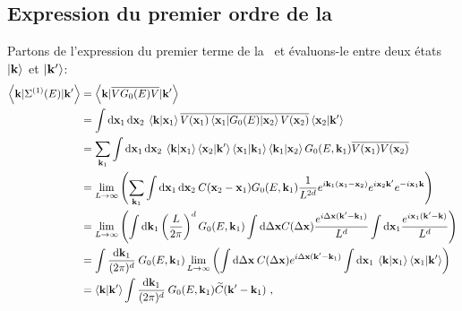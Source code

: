 \subsection{Expression du premier ordre de la \selfenergy}
Partons de l'expression du premier terme de la \selfenergy\ et évaluons-le entre deux états $\left| \mathbf{k} \right\rangle$ et $\left| \mathbf{k}' \right\rangle$:
\begin{align}
\left\langle \mathbf{k} | \Sigma^{(1)}(E) | \mathbf{k}' \right\rangle &= \left\langle \mathbf{k} | \overline{V G_0(E) V} | \mathbf{k}' \right\rangle \\
&= \int{ \mathop{}\mathopen{}\mathrm{d}\mathbf{x}_{\mathrm{1}} \mathop{}\mathopen{}\mathrm{d}\mathbf{x}_{\mathrm{2}} \: \left\langle \mathbf{k} | \mathbf{x}_{\mathrm{1}} \right\rangle \overline{V(\mathbf{x}_{\mathrm{1}}) \left\langle \mathbf{x}_{\mathrm{1}} | G_0(E) | \mathbf{x}_{\mathrm{2}}\right\rangle V(\mathbf{x}_{\mathrm{2}}) } \left\langle \mathbf{x}_{\mathrm{2}} |\mathbf{k}' \right\rangle} \\
&= \sum_{\mathbf{k}_{\mathrm{1}}}{\int{\mathop{}\mathopen{}\mathrm{d}\mathbf{x}_{\mathrm{1}} \mathop{}\mathopen{}\mathrm{d}\mathbf{x}_{\mathrm{2}} \: \left\langle \mathbf{k} |\mathbf{x}_{\mathrm{1}} \right\rangle \left\langle \mathbf{x}_{\mathrm{2}} | \mathbf{k}' \right\rangle \left\langle \mathbf{x}_{\mathrm{1}} | \mathbf{k}_{\mathrm{1}} \right\rangle \left\langle \mathbf{k}_{\mathrm{1}} | \mathbf{x}_{\mathrm{2}} \right\rangle G_0(E,\mathbf{k}_{\mathrm{1}})\overline{V(\mathbf{x}_{\mathrm{1}})V(\mathbf{x}_{\mathrm{2}})}}} \\
&= \lim\limits_{L\rightarrow\infty} \left( \sum_{\mathbf{k}_{\mathrm{1}}}{\int{\mathop{}\mathopen{}\mathrm{d}\mathbf{x}_{\mathrm{1}}\mathop{}\mathopen{}\mathrm{d}\mathbf{x}_{\mathrm{2}}\: C(\mathbf{x}_{\mathrm{2}}-\mathbf{x}_{\mathrm{1}}) G_0(E,\mathbf{k}_{\mathrm{1}}) \frac{1}{L^{2d}} e^{i \mathbf{k}_{\mathrm{1}}(\mathbf{x}_{\mathrm{1}}-\mathbf{x}_{\mathrm{2}})} e^{i \mathbf{x}_{\mathrm{2}} \mathbf{k}'} e^{-i \mathbf{x}_{\mathrm{1}} \mathbf{k}} }} \right) \\
&= \lim\limits_{L\rightarrow\infty} \left( \int{\mathop{}\mathopen{}\mathrm{d}\mathbf{k}_{\mathrm{1}}  \left(\frac{L}{2\pi}\right)^d G_0(E,\mathbf{k}_{\mathrm{1}}) \int{\mathop{}\mathopen{}\mathrm{d}\Delta\mathbf{x}  C(\Delta\mathbf{x}) \frac{e^{i \Delta\mathbf{x}(\mathbf{k}'-\mathbf{k}_{\mathrm{1}})}}{L^d}} \int{\mathop{}\mathopen{}\mathrm{d}\mathbf{x}_{\mathrm{1}} \frac{e^{i \mathbf{x}_{\mathrm{1}}(\mathbf{k}'-\mathbf{k})}}{L^d}} } \right) \\
&=\int{\frac{\mathop{}\mathopen{}\mathrm{d}\mathbf{k}_{\mathrm{1}}}{(2\pi)^d} \: G_0(E,\mathbf{k}_{\mathrm{1}}) \lim\limits_{L\rightarrow\infty}\left( \int{\mathop{}\mathopen{}\mathrm{d}\Delta\mathbf{x} \: C(\Delta\mathbf{x}) e^{i\Delta\mathbf{x}(\mathbf{k}'-\mathbf{k}_{\mathrm{1}})}} \int{\mathop{}\mathopen{}\mathrm{d}\mathbf{x}_{\mathrm{1}} \: \left\langle \mathbf{k} | \mathbf{x}_{\mathrm{1}}\right\rangle \left\langle \mathbf{x}_{\mathrm{1}} | \mathbf{k}' \right\rangle } \right)} \\
&= \left\langle \mathbf{k} | \mathbf{k}' \right\rangle \int{\frac{\mathop{}\mathopen{}\mathrm{d}\mathbf{k}_{\mathrm{1}}}{(2\pi)^d} \: G_0(E,\mathbf{k}_{\mathrm{1}}) \widetilde{C}(\mathbf{k}'-\mathbf{k}_{\mathrm{1}})} \text{ ,}
\end{align}
